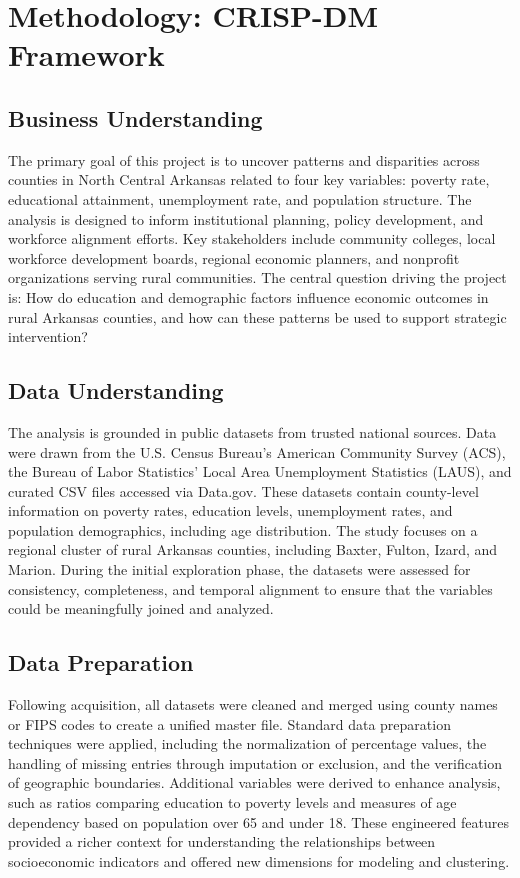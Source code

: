 \documentclass[12pt]{llncs}
\begin{document}
\section{Methodology: CRISP-DM Framework}
\subsection{Business Understanding}
The primary goal of this project is to uncover patterns and disparities across counties in North Central Arkansas related to four key variables: poverty rate, educational attainment, unemployment rate, and population structure. The analysis is designed to inform institutional planning, policy development, and workforce alignment efforts. Key stakeholders include community colleges, local workforce development boards, regional economic planners, and nonprofit organizations serving rural communities. The central question driving the project is: How do education and demographic factors influence economic outcomes in rural Arkansas counties, and how can these patterns be used to support strategic intervention?
\subsection{Data Understanding}
The analysis is grounded in public datasets from trusted national sources. Data were drawn from the U.S. Census Bureau’s American Community Survey (ACS), the Bureau of Labor Statistics’ Local Area Unemployment Statistics (LAUS), and curated CSV files accessed via Data.gov. These datasets contain county-level information on poverty rates, education levels, unemployment rates, and population demographics, including age distribution. The study focuses on a regional cluster of rural Arkansas counties, including Baxter, Fulton, Izard, and Marion. During the initial exploration phase, the datasets were assessed for consistency, completeness, and temporal alignment to ensure that the variables could be meaningfully joined and analyzed.
\subsection{Data Preparation}
Following acquisition, all datasets were cleaned and merged using county names or FIPS codes to create a unified master file. Standard data preparation techniques were applied, including the normalization of percentage values, the handling of missing entries through imputation or exclusion, and the verification of geographic boundaries. Additional variables were derived to enhance analysis, such as ratios comparing education to poverty levels and measures of age dependency based on population over 65 and under 18. These engineered features provided a richer context for understanding the relationships between socioeconomic indicators and offered new dimensions for modeling and clustering.
\end{document}
